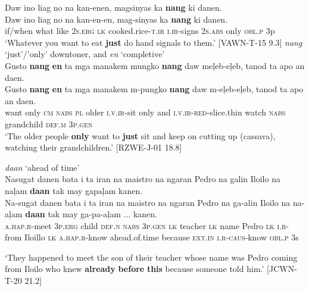 \ea
Daw  ino  liag  no  na  kan-enen,  magsinyas  ka  \textbf{nang}  ki  danen. \\\smallskip
 \gll Daw  ino  liag  no  na  kan-en-en,  mag-sinyas  ka  \textbf{nang}  ki  danen. \\
if/when  what  like  2\textsc{s.erg}  \textsc{lk}  cooked.rice-\textsc{t.ir}  \textsc{i.ir}-signs  2\textsc{s.abs}  only  \textsc{obl.p}  3p \\
\glt ‘Whatever you want to eat \textbf{just} do hand signals to them.’ [VAWN-T-15 9.3]
\z
\ea
\textit{nang} ‘just’/’only’ downtoner, and \textit{en} ‘completive’ \\
Gusto  \textbf{nang}  \textbf{en}  ta    mga  manakem  mungko  \textbf{nang} daw  meļeb-eļeb,  tanod  ta  apo  an  daen. \\\smallskip
 \gll Gusto  \textbf{nang}  \textbf{en}  ta    mga  manakem  m-pungko  \textbf{nang} daw  m-eļeb-eļeb,  tanod  ta  apo  an  daen. \\
want  only  \textsc{cm}  \textsc{nabs}  \textsc{pl}  older  \textsc{i.v.ir}-sit  only
and  \textsc{i.v.ir}-\textsc{red}-slice.thin  watch  \textsc{nabs}  grandchild  \textsc{def.m}  3\textsc{p.gen} \\
\glt`The older people \textbf{only} want to \textbf{just} sit and keep on cutting up (cassava), watching their grandchildren.’ [RZWE-J-01 18.8]
\z

\ea
\textit{daan} ‘ahead of time’ \\
    Nasugat  danen  bata  i  ta  iran  na  maistro  na  ngaran Pedro  na  galin  Iloilo  na  naļam  \textbf{daan}  tak may gapaļam kanen. \\\smallskip
 \gll Na-sugat  danen  bata  i  ta  iran  na  maistro  na  ngaran Pedro  na  ga-alin  Iloilo  na  na-aļam  \textbf{daan}  tak may ga-pa-aļam {...}\footnotemark{} kanen. \\
        \textsc{a.hap.r}-meet  3\textsc{p.erg}  child  \textsc{def.n}  \textsc{nabs}  3\textsc{p.gen}  \textsc{lk}  teacher  \textsc{lk}  name  Pedro  \textsc{lk}  \textsc{i.r}-from  Iloillo  \textsc{lk}  \textsc{a.hap.r}-know  ahead.of.time  because  \textsc{ext.in} \textsc{i.r}-\textsc{caus}-know \textsc{obl.p} 3s \\

\newpage
\glt `They happened to meet the son of their teacher whose name was Pedro coming from Iloilo who knew \textbf{already} \textbf{before} \textbf{this} because someone told him.’ [JCWN-T-20 21.2]
\z

